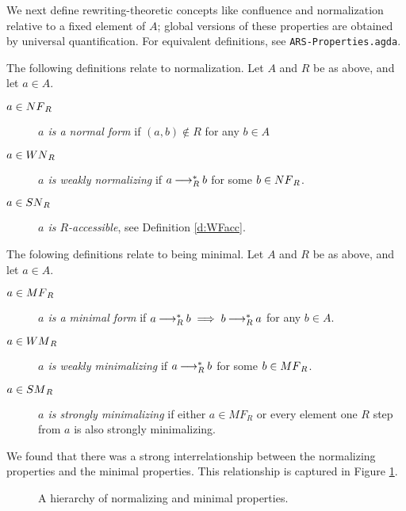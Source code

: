 We next define rewriting-theoretic concepts like confluence and normalization relative to a fixed element of $A$; global versions of these properties are obtained by universal quantification.
For equivalent definitions, see \texttt{ARS-Properties.agda}.

\begin{definition} The following definitions relate to normalization. Let $A$ and $R$ be as above, and let $a \in A$.
  \begin{description}
    \item[$a \in \NF_R$] \emph{$a$ is a normal form} if $(a,b) \notin R$ for any $b \in A$ 
    \item[$a \in \WN_R$] \emph{$a$ is weakly normalizing} if $a \mathbin{\longrightarrow_R^*} b$ for some $b \in \NF_R$.
    \item[$a \in \SN_R$]  \emph{$a$ is $R$-accessible}, see Definition \ref{d:WFacc}.
  \end{description}
\end{definition} 

 
\begin{definition} The folowing definitions relate to being minimal. Let $A$ and $R$ be as above, and let $a \in A$.
    \begin{description}
        \item[$a \in \MF_R$] \emph{$a$ is a minimal form} if $a \mathbin{\longrightarrow_R^*} b \implies b \mathbin{\longrightarrow_R^*} a$ for any $b \in A$.
        \item[$a \in \WM_R$] \emph{$a$ is weakly minimalizing} if $a \mathbin{\longrightarrow_R^*} b$ for some $b \in \MF_R$.
        \item[$a \in \SM_R$]  \emph{$a$ is strongly minimalizing} if either $a \in MF_R$ or every element one $R$ step from $a$ is also strongly minimalizing.
    \end{description}
\end{definition}
We found that there was a strong interrelationship between the normalizing properties and the minimal properties. This relationship is 
captured in Figure \ref{fig:norm-hierarchy}.

\begin{figure}[h]   
    \centering
        \caption{A hierarchy of normalizing and minimal properties.}
        \label{fig:norm-hierarchy}
\end{figure}

